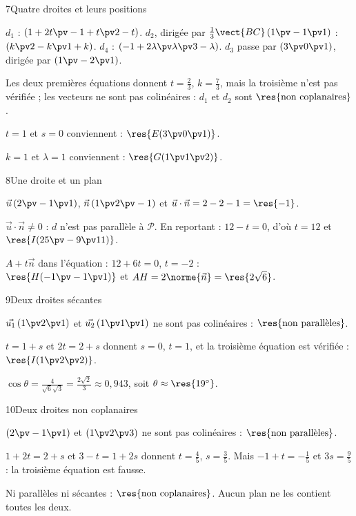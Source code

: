 \begin{deuxcolonnes}
\begin{corrige}{7}{Quatre droites et leurs positions}
\begin{questions}
  \item $d_1$ : $(1+2t\pv-1+t\pv2-t)$. $d_2$, dirigée par $\frac13\vect{BC}\,(1\pv-1\pv1)$ : $(k\pv2-k\pv1+k)$. $d_4$ :
    $(-1+2\lambda\pv\lambda\pv3-\lambda)$. $d_3$ passe par $(3\pv0\pv1)$, dirigée par $(1\pv-2\pv1)$.
  \item Les deux premières équations donnent $t=\frac23$, $k=\frac73$, mais la troisième n'est pas vérifiée ; les vecteurs ne sont
    pas colinéaires : $d_1$ et $d_2$ sont $\res{\text{non coplanaires}}$.
  \item $t=1$ et $s=0$ conviennent : $\res{E(3\pv0\pv1)}$.
  \item $k=1$ et $\lambda=1$ conviennent : $\res{G(1\pv1\pv2)}$.
\end{questions}
\end{corrige}

\begin{corrige}{8}{Une droite et un plan}
\begin{questions}
  \item $\vec u\,(2\pv-1\pv1)$, $\vec n\,(1\pv2\pv-1)$ et $\vec u\cdot\vec n=2-2-1=\res{-1}$.
  \item $\vec u\cdot\vec n\neq0$ : $d$ n'est pas parallèle à $\mathcal{P}$. En reportant : $12-t=0$, d'où $t=12$ et
    $\res{I(25\pv-9\pv11)}$.
  \item $A+t\vec n$ dans l'équation : $12+6t=0$, $t=-2$ :\\ $\res{H(-1\pv-1\pv1)}$ et $AH=2\norme{\vec n}=\res{2\sqrt6}$.
\end{questions}
\end{corrige}

\begin{corrige}{9}{Deux droites sécantes}
\begin{questions}
  \item $\vec{u_1}\,(1\pv2\pv1)$ et $\vec{u_2}\,(1\pv1\pv1)$ ne sont pas colinéaires : $\res{\text{non parallèles}}$.
  \item $t=1+s$ et $2t=2+s$ donnent $s=0$, $t=1$, et la troisième équation est vérifiée : $\res{I(1\pv2\pv2)}$.
  \item $\cos\theta=\frac{4}{\sqrt6\sqrt3}=\frac{2\sqrt2}{3}\approx0{,}943$, soit $\theta\approx\res{19^\circ}$.
\end{questions}
\end{corrige}

\begin{corrige}{10}{Deux droites non coplanaires}
\begin{questions}
  \item $(2\pv-1\pv1)$ et $(1\pv2\pv3)$ ne sont pas colinéaires : $\res{\text{non parallèles}}$.
  \item $1+2t=2+s$ et $3-t=1+2s$ donnent $t=\frac45$, $s=\frac35$. Mais $-1+t=-\frac15$ et $3s=\frac95$ : la troisième équation est
    fausse.
  \item Ni parallèles ni sécantes : $\res{\text{non coplanaires}}$. Aucun plan ne les contient toutes les deux.
\end{questions}
\end{corrige}


\end{deuxcolonnes}
